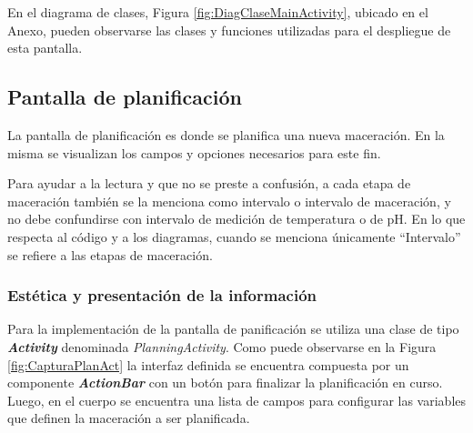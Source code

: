                 \par En el diagrama de clases, Figura \ref{fig:DiagClaseMainActivity}, ubicado en el Anexo, pueden observarse las clases y funciones utilizadas para el despliegue de esta pantalla.
                
                
        \subsection{Pantalla de planificación}
        \label{DescripPantallaPlanificación}
            \par La pantalla de planificación es donde se planifica una nueva maceración. En la misma se visualizan los campos y opciones necesarios para este fin. 
            \par Para ayudar a la lectura y que no se preste a confusión, a cada etapa de maceración también se la menciona como intervalo o intervalo de maceración, y no debe confundirse con intervalo de medición de temperatura o de pH. En lo que respecta al código y a los diagramas, cuando se menciona únicamente ``Intervalo'' se refiere a las etapas de maceración.
        
        \subsubsection{Estética y presentación de la información}
                \par Para la implementación de la pantalla de panificación se utiliza una clase de tipo \textbf{\textit{\gls{Activity}}} denominada \textit{PlanningActivity}. Como puede observarse en la Figura \ref{fig:CapturaPlanAct} la interfaz definida se encuentra compuesta por un componente \textbf{\textit{\gls{ActionBar}}} con un botón para finalizar la planificación en curso. Luego, en el cuerpo se encuentra una lista de campos para configurar las variables que definen la maceración a ser planificada.
                
